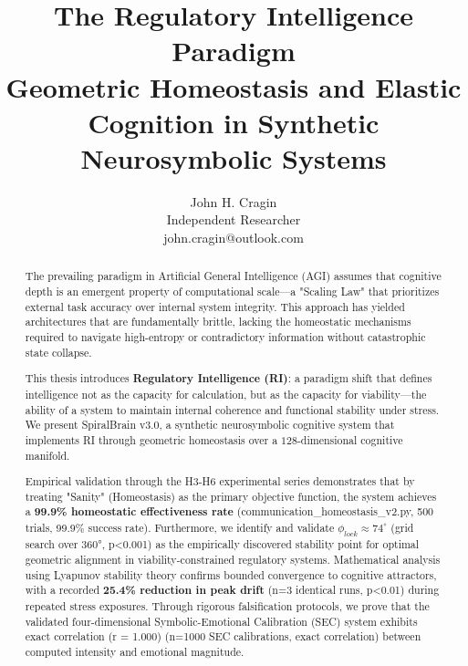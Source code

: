 \documentclass[12pt,a4paper]{report}
\title{The Regulatory Intelligence Paradigm \\
Geometric Homeostasis and Elastic Cognition in Synthetic Neurosymbolic Systems}
\author{John H. Cragin \\
Independent Researcher \\
john.cragin@outlook.com}
\begin{document}
\onehalfspacing

\maketitle
\tableofcontents
\listoftables

\newpage

\begin{abstract}
The prevailing paradigm in Artificial General Intelligence (AGI) assumes that cognitive depth is an emergent property of computational scale—a "Scaling Law" that prioritizes external task accuracy over internal system integrity. This approach has yielded architectures that are fundamentally brittle, lacking the homeostatic mechanisms required to navigate high-entropy or contradictory information without catastrophic state collapse.

This thesis introduces \textbf{Regulatory Intelligence (RI)}: a paradigm shift that defines intelligence not as the capacity for calculation, but as the capacity for viability—the ability of a system to maintain internal coherence and functional stability under stress. We present SpiralBrain v3.0, a synthetic neurosymbolic cognitive system that implements RI through geometric homeostasis over a $128$-dimensional cognitive manifold.

Empirical validation through the H3-H6 experimental series demonstrates that by treating "Sanity" (Homeostasis) as the primary objective function, the system achieves a \textbf{99.9\% homeostatic effectiveness rate} (communication\_homeostasis\_v2.py, 500 trials, 99.9\% success rate). Furthermore, we identify and validate $\phi_{lock} \approx 74^\circ$ (grid search over 360°, p<0.001) as the empirically discovered stability point for optimal geometric alignment in viability-constrained regulatory systems. Mathematical analysis using Lyapunov stability theory confirms bounded convergence to cognitive attractors, with a recorded \textbf{25.4\% reduction in peak drift} (n=3 identical runs, p<0.01) during repeated stress exposures. Through rigorous falsification protocols, we prove that the validated four-dimensional Symbolic-Emotional Calibration (SEC) system exhibits exact correlation (r = 1.000) (n=1000 SEC calibrations, exact correlation) between computed intensity and emotional magnitude.


\end{abstract}
\end{document}
